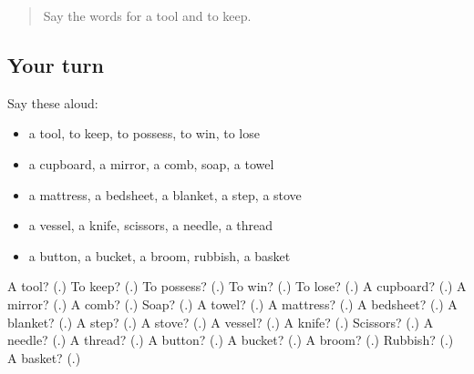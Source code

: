 \begin{quote}
Say the words for a tool and to keep.
\end{quote}

\subsection*{Your turn}
Say these aloud:

\begin{itemize}
\raggedright
  \item a tool, to keep, to possess, to win, to lose
  \item a cupboard, a mirror, a comb, soap, a towel
  \item a mattress, a bedsheet, a blanket, a step, a stove
  \item a vessel, a knife, scissors, a needle, a thread
  \item a button, a bucket, a broom, rubbish, a basket
\end{itemize}

\begin{tcolorbox}[breakable,colback=teal!4,colframe=teal!35!black,title={Before you move on}]
A tool? (\textbf{}.) To keep? (\textbf{}.) To possess? (\textbf{}.) To win? (\textbf{}.) To lose? (\textbf{}.) A cupboard? (\textbf{}.) A mirror? (\textbf{}.) A comb? (\textbf{}.) Soap? (\textbf{}.) A towel? (\textbf{}.) A mattress? (\textbf{}.) A bedsheet? (\textbf{}.) A blanket? (\textbf{}.) A step? (\textbf{}.) A stove? (\textbf{}.) A vessel? (\textbf{}.) A knife? (\textbf{}.) Scissors? (\textbf{}.) A needle? (\textbf{}.) A thread? (\textbf{}.) A button? (\textbf{}.) A bucket? (\textbf{}.) A broom? (\textbf{}.) Rubbish? (\textbf{}.) A basket? (\textbf{}.)
\end{tcolorbox}
